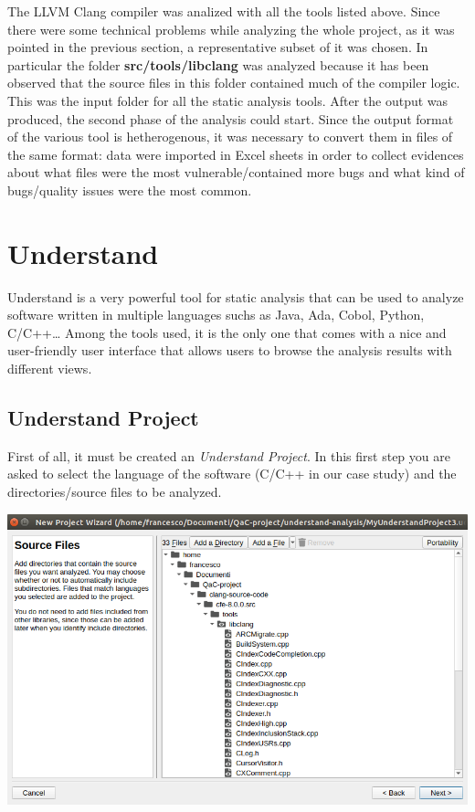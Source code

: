 The LLVM Clang compiler was analized with all the tools listed above.\newline
Since there were some technical problems while analyzing the whole project, as it was pointed in the previous section, a representative subset of it was chosen. In particular the folder \textbf{src/tools/libclang} was analyzed because it has been observed that the source files in this folder contained much of the compiler logic. This was the input folder for all the static analysis tools.\newline\newline
After the output was produced, the second phase of the analysis could start. Since the output format of the various tool is hetherogenous, it was necessary to convert them in files of the same format: data were imported in Excel sheets in order to collect evidences about what files were the most vulnerable/contained more bugs and what kind of bugs/quality issues were the most common.

\section{Understand}

Understand is a very powerful tool for static analysis that can be used to analyze software written in multiple languages suchs as Java, Ada, Cobol, Python, C/C++\dots
Among the tools used, it is the only one that comes with a nice and user-friendly user interface that allows users to browse the analysis results with different views.

\subsection{Understand Project}

First of all, it must be created an \textsl{Understand Project}. In this first step you are asked to select the language of the software (C/C++ in our case study) and the directories/source files to be analyzed.\newline\newline
\vspace{1cm}
\begin{minipage}{\linewidth}
	\includegraphics[width=\textwidth]{img/libclangDirectory.png}
\end{minipage}

